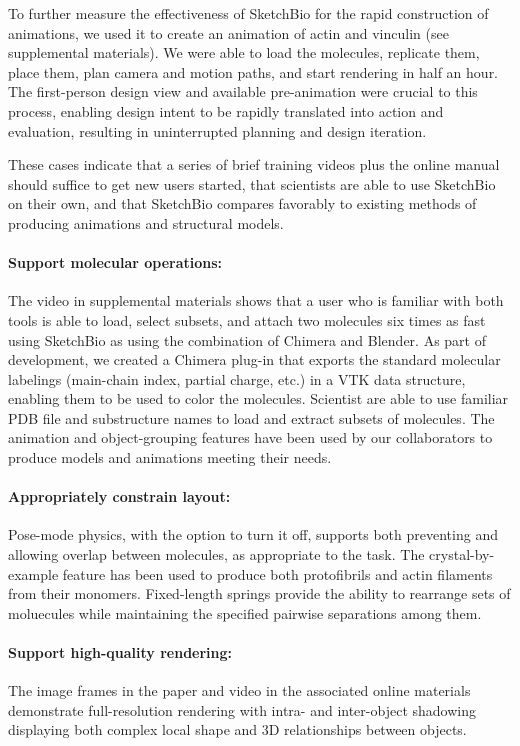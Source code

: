 \documentclass[twocolumn]{bmcart}%
\begin{document}
To further measure the effectiveness of SketchBio for the rapid construction of animations, we used it to create an animation of actin and vinculin (see supplemental materials).
We were able to load the molecules, replicate them, place them, plan camera and motion paths, and start rendering in half an hour.
The first-person design view and available pre-animation were crucial to this process, enabling design intent to be rapidly translated into action and evaluation, resulting in uninterrupted planning and design iteration.

These cases indicate that a series of brief training videos plus the online manual should suffice to get new users started, that scientists are able to use SketchBio on their own, and that SketchBio compares favorably to existing methods of producing animations and structural models.

\paragraph*{Support molecular operations:}
The video in supplemental materials shows that a user who is familiar with both tools is able to load, select subsets, and attach two molecules six times as fast using SketchBio as using the combination of Chimera and Blender. As part of development, we created a Chimera plug-in that exports the standard molecular labelings (main-chain index, partial charge, etc.) in a VTK data structure, enabling them to be used to color the molecules. Scientist are able to use familiar PDB file and substructure names to load and extract subsets of molecules. The animation and object-grouping features have been used by our collaborators to produce models and animations meeting their needs.

\paragraph*{Appropriately constrain layout:}
Pose-mode physics, with the option to turn it off, supports both preventing and allowing overlap between molecules, as appropriate to the task. The crystal-by-example feature has been used to produce both protofibrils and actin filaments from their monomers. Fixed-length springs provide the ability to rearrange sets of moluecules while maintaining the specified pairwise separations among them.

\paragraph*{Support high-quality rendering:}
The image frames in the paper and video in the associated online materials demonstrate full-resolution rendering with intra- and inter-object shadowing displaying both complex local shape and 3D relationships between objects.
\end{document}
